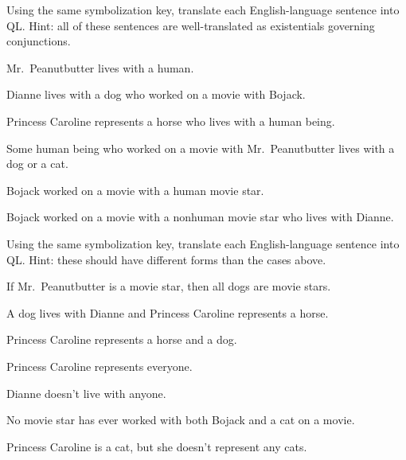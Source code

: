 \solutions
\problempart
\label{pr.QLbojacksome}
Using the same symbolization key, translate each English-language sentence into QL. Hint: all of these sentences are well-translated as existentials governing conjunctions.
\begin{earg}
\item Mr.\ Peanutbutter lives with a human.
\item Dianne lives with a dog who worked on a movie with Bojack.
\item Princess Caroline represents a horse who lives with a human being.
\item Some human being who worked on a movie with Mr.\ Peanutbutter lives with a dog or a cat.
\item Bojack worked on a movie with a human movie star.
\item Bojack worked on a movie with a nonhuman movie star who lives with Dianne.
\end{earg}

\problempart
\label{pr.QLbojackother}
Using the same symbolization key, translate each English-language sentence into QL. Hint: these should have different forms than the cases above.
\begin{earg}
\item If Mr.\ Peanutbutter is a movie star, then all dogs are movie stars.
\item A dog lives with Dianne and Princess Caroline represents a horse.
\item Princess Caroline represents a horse and a dog.
\item Princess Caroline represents everyone.
\item Dianne doesn't live with anyone.
\item No movie star has ever worked with both Bojack and a cat on a movie.
\item Princess Caroline is a cat, but she doesn't represent any cats.
\end{earg}



